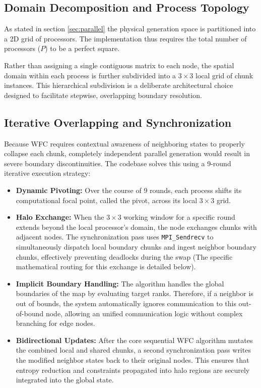 \subsection{Domain Decomposition and Process Topology}
As stated in section \ref{sec:parallel} the physical generation space is partitioned into a 2D grid of processors. The implementation thus requires the total number of processors ($P$) to be a perfect square. 

Rather than assigning a single contiguous matrix to each node, the spatial domain within each process is further subdivided into a $3 \times 3$ local grid of chunk instances. This hierarchical subdivision is a deliberate architectural choice designed to facilitate stepwise, overlapping boundary resolution.

\subsection{Iterative Overlapping and Synchronization}

Because WFC requires contextual awareness of neighboring states to properly collapse each chunk, completely independent parallel generation would result in severe boundary discontinuities. The codebase solves this using a 9-round iterative execution strategy:

\begin{itemize}
    \item \textbf{Dynamic Pivoting:} Over the course of 9 rounds, each process shifts its computational focal point, called the pivot, across its local $3 \times 3$ grid.
    
    \item \textbf{Halo Exchange:} When the $3 \times 3$ working window for a specific round extends beyond the local processor's domain, the node exchanges chunks with adjacent nodes. The synchronization pass uses \texttt{MPI\_Sendrecv} to simultaneously dispatch local boundary chunks and ingest neighbor boundary chunks, effectively preventing deadlocks during the swap (The specific mathematical routing for this exchange is detailed below).
    
    \item \textbf{Implicit Boundary Handling:} The algorithm handles the global boundaries of the map by evaluating target ranks. Therefore, if a neighbor is out of bounds, the system automatically ignores communication to this out-of-bound node, allowing an unified communication logic without complex branching for edge nodes.
    
    \item \textbf{Bidirectional Updates:} After the core sequential WFC algorithm mutates the combined local and shared chunks, a second synchronization pass writes the modified neighbor states back to their original nodes. This ensures that entropy reduction and constraints propagated into halo regions are securely integrated into the global state.
    
\end{itemize}

